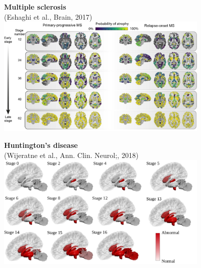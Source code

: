 \documentclass[8pt,xcolor=table]{beamer}
\begin{document}
\begin{frame}
\begin{small}
\begin{figure}[h]
    \begin{minipage}[t][\mnpHeight][t]{0.49\linewidth}
  \centering
    \textbf{Multiple sclerosis}\\ \footnotesize{(Eshaghi et al., Brain, 2017)}\\    
    \includegraphics[width=0.9\textwidth,trim=0 0 0 0,clip]{ms_arman}
      \vspace{1em}
  \end{minipage}
  \begin{minipage}[t][\mnpHeight][t]{0.49\linewidth}
    \centering
    \textbf{Huntington's disease}\\ \footnotesize{(Wijeratne et al., Ann. Clin. Neurol;, 2018)}
    \includegraphics[width=0.9\textwidth,trim=0 0 0 0, clip]{hd_peter}
  \end{minipage}

\end{figure}
  \end{small}
  
  



\end{frame}
\end{document}
